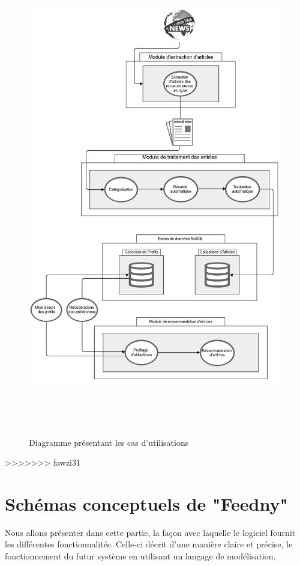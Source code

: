 \begin{figure}[H]
    \centering
    \includegraphics[height=600pt,width=450pt]{img/chapter3/global.png}
    \caption{Diagramme présentant les cas d'utilisations}
\end{figure}

>>>>>>> fawzi31

\section{Schémas conceptuels de "Feedny"}
Nous allons présenter dans cette partie, la façon avec laquelle le logiciel fournit les différentes fonctionnalités. Celle-ci décrit d'une manière claire et précise, le fonctionnement du futur système en utilisant un langage de modélisation. 

